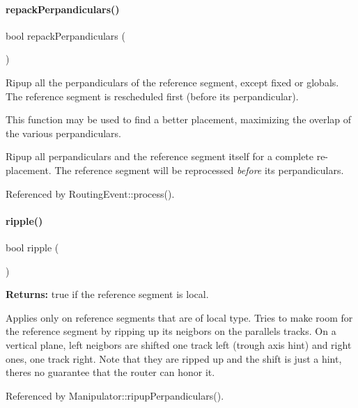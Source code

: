 \paragraph{\texorpdfstring{repack\+Perpandiculars()}{repackPerpandiculars()}}
{\footnotesize\ttfamily bool repack\+Perpandiculars (\begin{DoxyParamCaption}{ }\end{DoxyParamCaption})}

Ripup all the perpandiculars of the reference segment, except fixed or globals. The reference segment is rescheduled first (before it\textquotesingle{}s perpandicular).

This function may be used to find a better placement, maximizing the overlap of the various perpandiculars.

Ripup all perpandiculars and the reference segment itself for a complete re-\/placement. The reference segment will be reprocessed {\itshape before} it\textquotesingle{}s perpandiculars. 

Referenced by Routing\+Event\+::process().

\mbox{\label{classKite_1_1Manipulator_af46102d49a7aa0c163de1bf143807794}} 
\paragraph{\texorpdfstring{ripple()}{ripple()}}
{\footnotesize\ttfamily bool ripple (\begin{DoxyParamCaption}{ }\end{DoxyParamCaption})}

{\bfseries Returns\+:} true if the reference segment is local.

Applies only on reference segments that are of local type. Tries to make room for the reference segment by ripping up it\textquotesingle{}s neigbors on the parallels tracks. On a vertical plane, left neigbors are shifted one track left (trough axis hint) and right ones, one track right. Note that they are ripped up and the shift is just a hint, there\textquotesingle{}s no guarantee that the router can honor it. 

Referenced by Manipulator\+::ripup\+Perpandiculars().

\mbox{\label{classKite_1_1Manipulator_aa61f08642d981761687635be108b9837}} 
